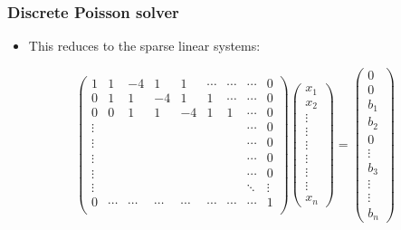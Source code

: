 \documentclass{beamer}
\begin{document}
\begin{frame}
    \frametitle{Discrete Poisson solver}    
    \begin{itemize}
        \item This reduces to the sparse linear systems:        
    \end{itemize}
    \[    
        \begin{pmatrix}
        1 & 1 & -4 & 1 &  1  & \cdots & \cdots & \cdots &  0\\
        0 & 1 & 1 & -4 & 1 & 1 & \cdots & \cdots & 0 \\
        0 & 0 & 1 & 1 & -4 & 1 & 1 & \cdots & 0 \\
        \vdots &  &  &  &  &  &  & \cdots &  0 \\
        \vdots &  &  &  &  &  &  & \cdots &  0 \\
        \vdots &  &  &  &  &  &  & \cdots &  0 \\
        \vdots &  &  &  &  &  &  & \cdots &  0 \\
        \vdots &  &  &  &  &  &  & \ddots &  \vdots \\
        0 & \cdots & \cdots & \cdots & \cdots & \cdots & \cdots & \cdots & 1 \\
        \end{pmatrix}
        \begin{pmatrix}
            x_1 \\
            x_2 \\
            \vdots\\
            \vdots\\
            \vdots\\
            \vdots\\
            \vdots\\
            \vdots\\            
            x_n 
        \end{pmatrix} = 
        \begin{pmatrix}
            0 \\
            0 \\
            b_1\\
            b_2\\
            0 \\
            \vdots\\
            b_3\\
            \vdots\\            
            \vdots\\            
            b_n 
        \end{pmatrix}
    \]
\end{frame} 
\end{document}
